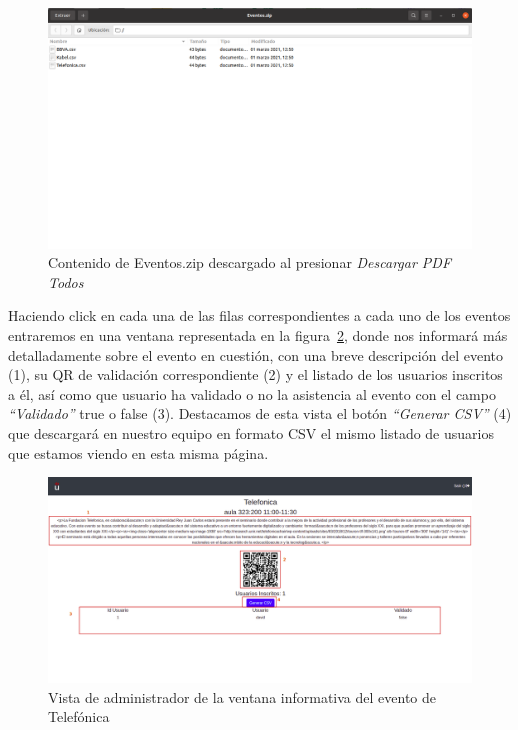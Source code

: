 \documentclass[a4paper, 12pt]{book}
\begin{document}
\begin{enumerate}
	\begin{figure}[h!]
  	\centering
  	\includegraphics[width=16cm, keepaspectratio]{img/AdminEventosZip.png}
  	\caption{Contenido de Eventos.zip descargado al presionar \textit{Descargar PDF Todos}}\label{fig:AdminEventosZip}
	\end{figure}
	
	 
	Haciendo click en cada una de las filas correspondientes a cada uno de los eventos entraremos en una ventana representada en la figura~\ref{fig:adminListaEventoTelefonica}, donde nos informará más detalladamente sobre el evento en cuestión, con una breve descripción del evento (1), su QR de validación correspondiente (2) y el listado de los usuarios inscritos a él, así como que usuario ha validado o no la asistencia al evento con el campo \textit{``Validado''} true o false (3). Destacamos de esta vista el botón \textit{``Generar CSV''} (4) que descargará en nuestro equipo en formato CSV el mismo listado de usuarios que estamos viendo en esta misma página.
	
	\begin{figure}[h!]
  	\centering
  	\includegraphics[width=16cm, keepaspectratio]{img/adminListaEventoTelefonica.png}
  	\caption{Vista de administrador de la ventana informativa del evento de Telefónica}\label{fig:adminListaEventoTelefonica}
	\end{figure}



\end{enumerate}
\end{document}
